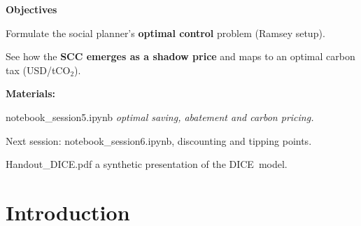 \documentclass[xcolor=x11names,compress,aspectratio=169]{beamer}%
\makeatletter
\renewenvironment{itemize}{\begin{compactitemize}[<+-| alert@+>]}{\end{compactitemize}}
\makeatother
\begin{document}
\begin{frame}%


\textbf{Objectives}

\begin{itemize}
\item Formulate the social planner's \textbf{optimal control} problem (Ramsey setup).

\item See how the \textbf{SCC emerges as a shadow price} and maps to an
optimal carbon tax (USD/tCO$_{2}$).%
\vspace{1ex}%

\end{itemize}

\textbf{Materials:}

\begin{itemize}
\item \textsf{notebook\_session5.ipynb} \textit{optimal saving, abatement and carbon pricing.}

\item Next session: \textsf{notebook\_session6.ipynb}, discounting and tipping points.

\item \textsf{Handout\_DICE.pdf} a synthetic presentation of the DICE\ model.
\end{itemize}

%

\transboxout
\end{frame}%


\section{Introduction}%
\end{document}
